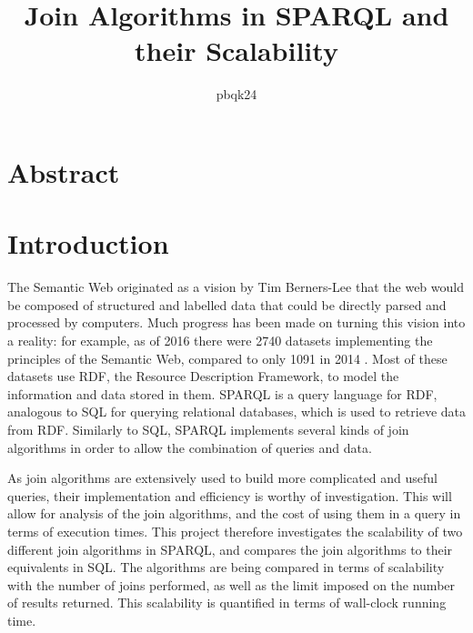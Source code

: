 \documentclass[10pt,a4paper]{article}
\title{\vspace{-2em}Join Algorithms in SPARQL and their Scalability}
\author{pbqk24}
\begin{document}
	\maketitle
	
	\vspace{-3em}
	
	\section*{Abstract}
	\section*{Introduction}
	The Semantic Web originated as a vision by Tim Berners-Lee that the web would be composed of structured and labelled data that could be directly parsed and processed by computers. Much progress has been made on turning this vision into a reality: for example, as of 2016 there were 2740 datasets implementing the principles of the Semantic Web, compared to only 1091 in 2014 \cite{Bizer}. Most of these datasets use RDF, the Resource Description Framework, to model the information and data stored in them. SPARQL is a query language for RDF, analogous to SQL for querying relational databases, which is used to retrieve data from RDF. Similarly to SQL, SPARQL implements several kinds of join algorithms in order to allow the combination of queries and data.
	
	As join algorithms are extensively used to build more complicated and useful queries, their implementation and efficiency is worthy of investigation. This will allow for analysis of the join algorithms, and the cost of using them in a query in terms of execution times. This project therefore investigates the scalability of two different join algorithms in SPARQL, and compares the join algorithms to their equivalents in SQL. The algorithms are being compared in terms of scalability with the number of joins performed, as well as the limit imposed on the number of results returned. This scalability is quantified in terms of wall-clock running time. %
	
	
\end{document}
